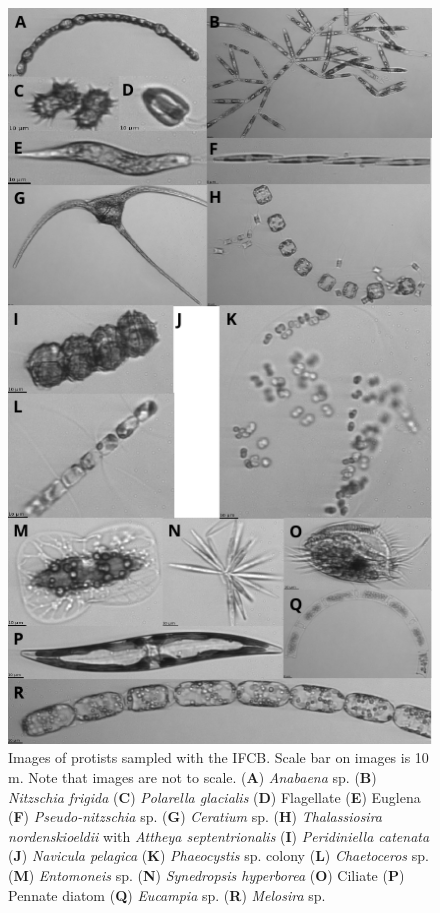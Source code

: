 \documentclass[essd, manuscript]{copernicus}
\begin{document}
\begin{figure}[H]
	\centering
	\includegraphics[scale = 1]{../../../../graphs/fig12.pdf}
	\caption{Images of protists sampled with the IFCB. Scale bar on images is 10 \textmu m. Note that images are not to scale. (\textbf{A}) \textit{Anabaena} sp. (\textbf{B}) \textit{Nitzschia frigida} (\textbf{C}) \textit{Polarella glacialis} (\textbf{D}) Flagellate (\textbf{E}) Euglena (\textbf{F}) \textit{Pseudo-nitzschia} sp. (\textbf{G}) \textit{Ceratium} sp. (\textbf{H}) \textit{Thalassiosira nordenskioeldii} with \textit{Attheya septentrionalis} (\textbf{I}) \textit{Peridiniella catenata} (\textbf{J}) \textit{Navicula pelagica} (\textbf{K}) \textit{Phaeocystis} sp. colony (\textbf{L}) \textit{Chaetoceros} sp. (\textbf{M}) \textit{Entomoneis} sp. (\textbf{N}) \textit{Synedropsis hyperborea} (\textbf{O}) Ciliate (\textbf{P}) Pennate diatom (\textbf{Q}) \textit{Eucampia} sp. (\textbf{R}) \textit{Melosira} sp.}
\end{figure}
\end{document}
